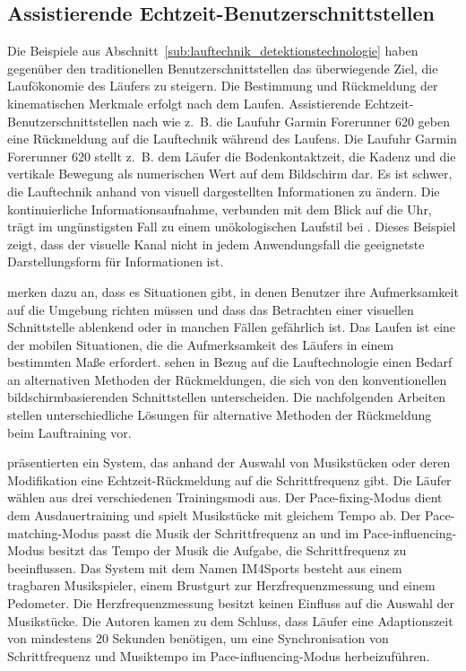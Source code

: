 \subsection{Assistierende Echtzeit-Benutzerschnittstellen} 

\label{sub:assistierende_echtzeit_benutzerschnittstellen}

Die Beispiele aus Abschnitt~\ref{sub:lauftechnik_detektionstechnologie} haben gegenüber den traditionellen Benutzerschnittstellen das überwiegende Ziel, die Laufökonomie des Läufers zu steigern. Die Bestimmung und Rückmeldung der kinematischen Merkmale erfolgt nach dem Laufen. Assistierende Echtzeit-Benutzerschnittstellen nach \citet{Jensen2014} wie z.~B. die Laufuhr Garmin Forerunner 620 geben eine Rückmeldung auf die Lauftechnik während des Laufens. Die Laufuhr Garmin Forerunner 620 stellt z.~B. dem Läufer die Bodenkontaktzeit, die Kadenz und die vertikale Bewegung als numerischen Wert auf dem Bildschirm dar. Es ist schwer, die Lauftechnik anhand von visuell dargestellten Informationen zu ändern. Die kontinuierliche Informationsaufnahme, verbunden mit dem Blick auf die Uhr, trägt im ungünstigsten Fall zu einem unökologischen Laufstil bei \citep{Jensen2014}. Dieses Beispiel zeigt, dass der visuelle Kanal nicht in jedem Anwendungsfall die geeignetste Darstellungsform für Informationen ist. 

\citet{Zhao2007} merken dazu an, dass es Situationen gibt, in denen Benutzer ihre Aufmerksamkeit auf die Umgebung richten müssen und dass das Betrachten einer visuellen Schnittstelle ablenkend oder in manchen Fällen gefährlich ist. Das Laufen ist eine der mobilen Situationen, die die Aufmerksamkeit des Läufers in einem bestimmten Maße erfordert. \citet{Jensen2014} sehen in Bezug auf die Lauftechnologie einen Bedarf an alternativen Methoden der Rückmeldungen, die sich von den konventionellen bildschirmbasierenden Schnittstellen unterscheiden. Die nachfolgenden Arbeiten stellen unterschiedliche Lösungen für alternative Methoden der Rückmeldung beim Lauftraining vor. 

\citet{Wijnalda2005} präsentierten ein System, das anhand der Auswahl von Musikstücken oder deren Modifikation eine Echtzeit-Rückmeldung auf die Schrittfrequenz gibt. Die Läufer wählen aus drei verschiedenen Trainingsmodi aus. Der Pace-fixing-Modus dient dem Ausdauertraining und spielt Musikstücke mit gleichem Tempo ab. Der Pace-matching-Modus passt die Musik der Schrittfrequenz an und im Pace-influencing-Modus besitzt das Tempo der Musik die Aufgabe, die Schrittfrequenz zu beeinflussen. Das System mit dem Namen IM4Sports besteht aus einem tragbaren Musikspieler, einem Brustgurt zur Herzfrequenzmessung und einem Pedometer. Die Herzfrequenzmessung besitzt keinen Einfluss auf die Auswahl der Musikstücke. Die Autoren kamen zu dem Schluss, dass Läufer eine Adaptionszeit von mindestens 20 Sekunden benötigen, um eine Synchronisation von Schrittfrequenz und Musiktempo im Pace-influencing-Modus herbeizuführen.

